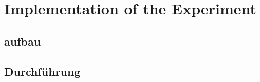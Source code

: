 \section{Implementation of the Experiment}
\label{sec:Durchführung}

\subsection{aufbau}
\label{subsec:}


\subsection{Durchführung}
\label{subsec:}
